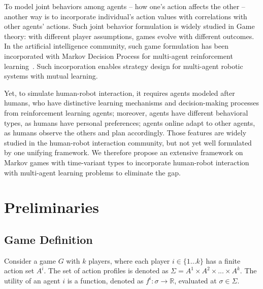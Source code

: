 \documentclass[letterpaper, 10 pt, conference]{ieeeconf}  %
\begin{document}
To model joint behaviors among agents -- how one's action affects the other -- another way is to incorporate individual's action values with correlations 
with other agents' actions. Such joint behavior formulation is widely studied 
in Game theory: with different player assumptions, games evolve with different 
outcomes. In the artificial intelligence community, such game 
formulation has been incorporated with Markov Decision Process for multi-agent 
reinforcement learning~\cite{littman1994markov}. Such incorporation enables strategy 
design for multi-agent robotic systems with mutual learning. 

Yet, to simulate human-robot interaction, it requires agents modeled after 
humans, who have distinctive learning mechanisms and decision-making processes 
from reinforcement learning agents; moreover, agents have different behavioral 
types, as humans have personal preferences; agents online adapt to other 
agents, as humans observe the others and plan accordingly. Those features are 
widely studied in the human-robot interaction community, but not yet well 
formulated by one unifying framework. We therefore propose 
an extensive framework on Markov games with time-variant types to incorporate 
human-robot interaction with multi-agent learning problems to eliminate the gap. 






\section{Preliminaries}
\vspace{-.2em}
\subsection{Game Definition}
\vspace{-.2em}
Consider a game $G$ with $k$ players, where each player $i \in \{1...k\}$ has 
a finite action set $A^i$. The set of action profiles is denoted as 
$\Sigma = A^1 \times A^2 \times ... \times A^k$. The utility of an 
agent $i$ is a function, denoted as $f^i: \sigma \rightarrow \mathbb{R} $, 
evaluated at $\sigma \in \Sigma$. 
\end{document}
